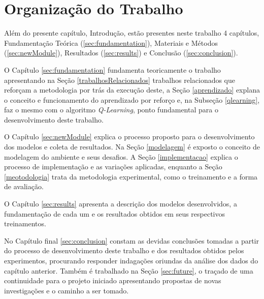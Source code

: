 \section{Organização do Trabalho}

Além do presente capítulo, Introdução, estão presentes neste trabalho 4 capítulos, Fundamentação
Teórica (\ref{sec:fundamentation}), Materiais e Métodos (\ref{sec:newModule}), Resultados
(\ref{sec:results}) e Conclusão (\ref{sec:conclusion}).

O Capítulo \ref{sec:fundamentation} fundamenta teoricamente o trabalho apresentando na Seção
\ref{trabalhosRelacionados} trabalhos relacionados que reforçam a metodologia por trás da execução
deste, a Seção \ref{aprendizado} explana o conceito e funcionamento do aprendizado por reforço e, na
Subseção \ref{qlearning}, faz o mesmo com o algoritmo \textit{Q-Learning}, ponto fundamental para o
desenvolvimento deste trabalho.

O Capítulo \ref{sec:newModule} explica o processo proposto para o desenvolvimento dos modelos e
coleta de resultados. Na Seção \ref{modelagem} é exposto o conceito de modelagem do ambiente e seus
desafios. A Seção \ref{implementacao} explica o processo de implementação e as
variações aplicadas, enquanto a Seção \ref{meotodologia} trata da metodologia
experimental, como o treinamento e a forma de avaliação.

O Capítulo \ref{sec:results} apresenta a descrição dos modelos desenvolvidos, a fundamentação de
cada um e os resultados obtidos em seus respectivos treinamentos.

No Capítulo final \ref{sec:conclusion} constam as devidas conclusões tomadas a partir do processo de
desenvolvimento deste trabalho e dos resultados obtidos pelos experimentos, procurando responder
indagações oriundas da análise dos dados do capítulo anterior. Também é
trabalhado na Seção \ref{sec:future}, o traçado de uma continuidade
para o projeto iniciado apresentando propostas de novas investigações e o caminho a ser tomado.